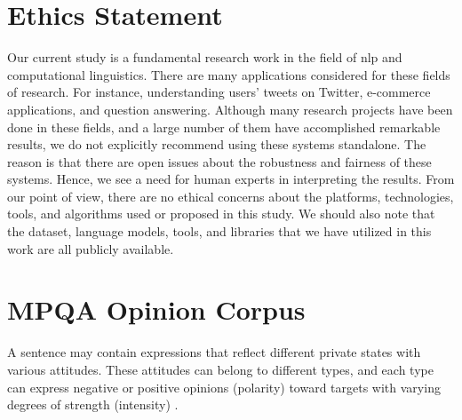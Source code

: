 \documentclass[11pt]{article}
\theoremstyle{definition}
\begin{document}
\section*{Ethics Statement}

Our current study is a fundamental research work in the field of \gls*{nlp} and computational linguistics.
There are many applications considered for these fields of research.
For instance, understanding users' tweets on Twitter, e-commerce applications, and question answering.
Although many research projects have been done in these fields, and a large number of them have accomplished remarkable results, we do not explicitly recommend using these systems standalone.
The reason is that there are open issues about the robustness and fairness of these systems. Hence, we see a need for human experts in interpreting the results. 
From our point of view, there are no ethical concerns about the platforms, technologies, tools, and algorithms used or proposed in this study.
We should also note that the dataset, language models, tools, and libraries that we have utilized in this work are all publicly available.



% 

\appendix

\section{MPQA Opinion Corpus}
\label{appendix:mpqa}

A sentence may contain expressions that reflect different private states with various attitudes. These attitudes can belong to different types, and each type can express negative or positive opinions (polarity) toward targets with varying degrees of strength (intensity) \cite{wiebe2005annotating, wilson2008fine}. 
\end{document}
